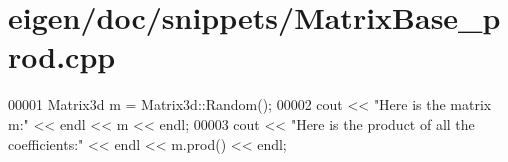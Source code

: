 \hypertarget{eigen_2doc_2snippets_2_matrix_base__prod_8cpp_source}{}\section{eigen/doc/snippets/\+Matrix\+Base\+\_\+prod.cpp}
\label{eigen_2doc_2snippets_2_matrix_base__prod_8cpp_source}

\begin{DoxyCode}
00001 Matrix3d m = Matrix3d::Random();
00002 cout << \textcolor{stringliteral}{"Here is the matrix m:"} << endl << m << endl;
00003 cout << \textcolor{stringliteral}{"Here is the product of all the coefficients:"} << endl << m.prod() << endl;
\end{DoxyCode}
